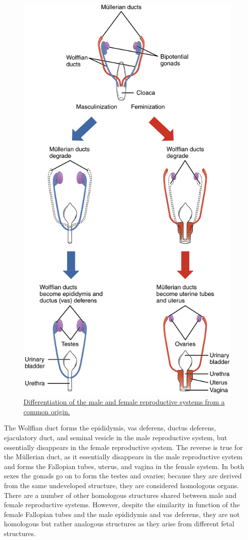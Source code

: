 \begin{figure}

{\centering \includegraphics[width=0.7\linewidth]{./figures/reproductive_system/2915_Sexual_Differentation-02} 

}

\caption{\href{https://commons.wikimedia.org/wiki/File:2915_Sexual_Differentation-02.jpg}{Differentiation of the male and female reproductive systems from a common origin.}}\label{fig:differentiationrepsys}
\end{figure}

The Wolffian duct forms the epididymis, vas deferens, ductus deferens, ejaculatory duct, and seminal vesicle in the male reproductive system, but essentially disappears in the female reproductive system. The reverse is true for the Müllerian duct, as it essentially disappears in the male reproductive system and forms the Fallopian tubes, uterus, and vagina in the female system. In both sexes the gonads go on to form the testes and ovaries; because they are derived from the same undeveloped structure, they are considered homologous organs. There are a number of other homologous structures shared between male and female reproductive systems. However, despite the similarity in function of the female Fallopian tubes and the male epididymis and vas deferens, they are not homologous but rather analogous structures as they arise from different fetal structures.

